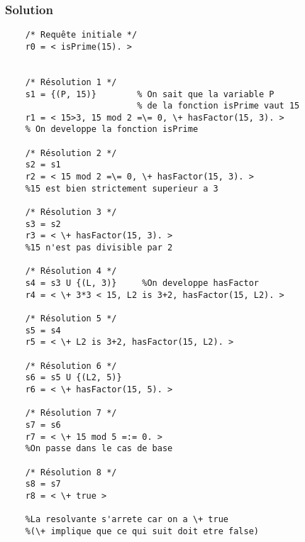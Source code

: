     \subsubsection*{Solution}
    
    \begin{lstlisting}
    /* Requête initiale */
    r0 = < isPrime(15). >
    
    
    /* Résolution 1 */
    s1 = {(P, 15)}        % On sait que la variable P
                          % de la fonction isPrime vaut 15           
    r1 = < 15>3, 15 mod 2 =\= 0, \+ hasFactor(15, 3). >
    % On developpe la fonction isPrime
    
    /* Résolution 2 */
    s2 = s1
    r2 = < 15 mod 2 =\= 0, \+ hasFactor(15, 3). >
    %15 est bien strictement superieur a 3
    
    /* Résolution 3 */
    s3 = s2
    r3 = < \+ hasFactor(15, 3). >
    %15 n'est pas divisible par 2
    
    /* Résolution 4 */
    s4 = s3 U {(L, 3)}     %On developpe hasFactor
    r4 = < \+ 3*3 < 15, L2 is 3+2, hasFactor(15, L2). >
    
    /* Résolution 5 */
    s5 = s4
    r5 = < \+ L2 is 3+2, hasFactor(15, L2). >
    
    /* Résolution 6 */
    s6 = s5 U {(L2, 5)}
    r6 = < \+ hasFactor(15, 5). >
    
    /* Résolution 7 */  
    s7 = s6   
    r7 = < \+ 15 mod 5 =:= 0. >  
    %On passe dans le cas de base
    
    /* Résolution 8 */
    s8 = s7   
    r8 = < \+ true >
    
    %La resolvante s'arrete car on a \+ true 
    %(\+ implique que ce qui suit doit etre false)
    \end{lstlisting}

